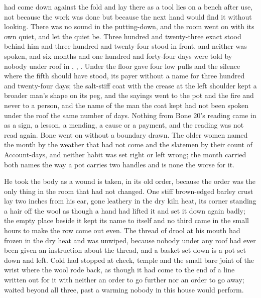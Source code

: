 
 had come down against the fold and lay there as a tool lies on a bench after use, not because the work was done but because the next hand would find it without looking. There was no sound in the putting-down, and the room went on with its own quiet, and  let the quiet be. Three hundred and twenty-three exact stood behind him and three hundred and twenty-four stood in front, and neither was spoken, and six months and one hundred and forty-four days were told by nobody under  roof in , , . Under the floor  gave four low pulls and the silence where the fifth should have stood, its payer without a name for three hundred and twenty-four days; the salt-stiff coat with the crease at the left shoulder kept a broader man's shape on its peg, and the sayings went to the pot and the fire and never to a person, and the name of the man the coat kept had not been spoken under the roof the same number of days. Nothing from Bone 20's reading came in as a sign, a lesson, a mending, a cause or a payment, and the reading was not read again. Bone went on without a boundary drawn. The older women named the month by the weather that had not come and the slatemen by their count of Account-days, and neither habit was set right or left wrong; the month carried both names the way a pot carries two handles and is none the worse for it.

He took the body as a wound is taken, in its old order, because the order was the only thing in the room that had not changed. One stiff brown-edged barley crust lay two inches from his ear, gone leathery in the dry kiln heat, its corner standing a hair off the wool as though a hand had lifted it and set it down again badly; the empty place beside it kept its name to itself and no third came in the small hours to make the row come out even. The thread of drool at his mouth had frozen in the dry heat and was unwiped, because nobody under any roof had ever been given an instruction about the thread, and a basket set down is a pot set down and left. Cold had stopped at cheek, temple and the small bare joint of the wrist where the wool rode back, as though it had come to the end of a line written out for it with neither an order to go further nor an order to go away;  waited beyond all three, past a warming nobody in this house would perform.

